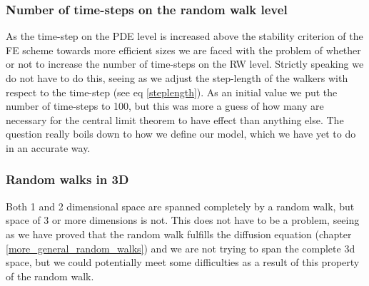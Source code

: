 \subsubsection{Number of time-steps on the random walk level}
 As the time-step on the PDE level is increased above the stability criterion of the FE scheme towards more efficient sizes we are faced with the problem of whether or not to increase the number of time-steps on the RW level. 
 Strictly speaking we do not have to do this, seeing as we adjust the step-length of the walkers with respect to the time-step (see eq \ref{steplength}). 
 As an initial value we put the number of time-steps to 100, but this was more a guess of how many are necessary for the central limit theorem to have effect than anything else. 
 The question really boils down to how we define our model, which we have yet to do in an accurate way.

\subsubsection{Random walks in 3D}
 Both 1 and 2 dimensional space are spanned completely by a random walk, but space of 3 or more dimensions is not. 
 This does not have to be a problem, seeing as we have proved that the random walk fulfills the diffusion equation (chapter \ref{more_general_random_walks}) and we are not trying to span the complete 3d space, but we could potentially meet some difficulties as a result of this property of the random walk.

